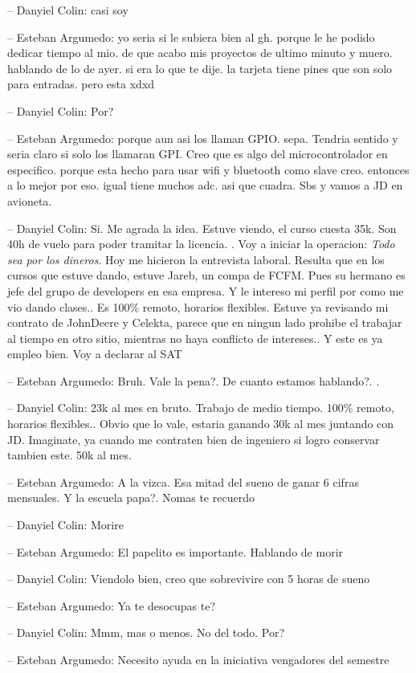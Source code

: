 -- Danyiel Colin: casi soy

-- Esteban Argumedo: yo seria si le subiera bien al gh. porque le he
podido dedicar tiempo al mio. de que acabo mis proyectos de ultimo
minuto y muero. hablando de lo de ayer. si era lo que te dije. la
tarjeta tiene pines que son solo para entradas. pero esta xdxd

-- Danyiel Colin: Por?

-- Esteban Argumedo: porque aun asi los llaman GPIO. sepa. Tendria
sentido y seria claro si solo los llamaran GPI. Creo que es algo del
microcontrolador en especifico. porque esta hecho para usar wifi y
bluetooth como slave creo. entonces a lo mejor por eso. igual tiene
muchos adc. asi que cuadra. Sbs y vamos a JD en avioneta.

-- Danyiel Colin: Si. Me agrada la idea. Estuve viendo, el curso cuesta
35k. Son 40h de vuelo para poder tramitar la licencia. . Voy a iniciar
la operacion: \emph{Todo sea por los dineros}. Hoy me hicieron la
entrevista laboral. Resulta que en los cursos que estuve dando, estuve
Jareb, un compa de FCFM. Pues su hermano es jefe del grupo de developers
en esa empresa. Y le intereso mi perfil por como me vio dando clases..
Es 100\% remoto, horarios flexibles. Estuve ya revisando mi contrato de
JohnDeere y Celekta, parece que en ningun lado prohibe el trabajar al
tiempo en otro sitio, mientras no haya conflicto de intereses.. Y este
es ya empleo bien. Voy a declarar al SAT

-- Esteban Argumedo: Bruh. Vale la pena?. De cuanto estamos hablando?. .

-- Danyiel Colin: 23k al mes en bruto. Trabajo de medio tiempo. 100\%
remoto, horarios flexibles.. Obvio que lo vale, estaria ganando 30k al
mes juntando con JD. Imaginate, ya cuando me contraten bien de ingeniero
si logro conservar tambien este. 50k al mes.

-- Esteban Argumedo: A la vizca. Esa mitad del sueno de ganar 6 cifras
mensuales. Y la escuela papa?. Nomas te recuerdo

-- Danyiel Colin: Morire

-- Esteban Argumedo: El papelito es importante. Hablando de morir

-- Danyiel Colin: Viendolo bien, creo que sobrevivire con 5 horas de
sueno

-- Esteban Argumedo: Ya te desocupas te?

-- Danyiel Colin: Mmm, mas o menos. No del todo. Por?

-- Esteban Argumedo: Necesito ayuda en la iniciativa vengadores del
semestre

